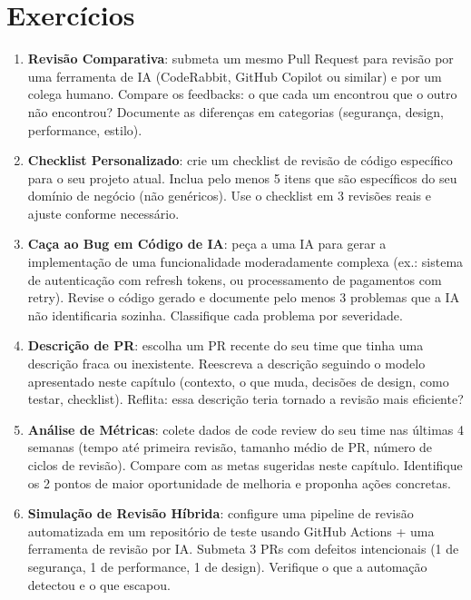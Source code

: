 \section*{Exercícios}

\begin{enumerate}
    \item \textbf{Revisão Comparativa}: submeta um mesmo Pull Request para
    revisão por uma ferramenta de IA (CodeRabbit, GitHub Copilot ou similar)
    e por um colega humano. Compare os feedbacks: o que cada um encontrou que
    o outro não encontrou? Documente as diferenças em categorias (segurança,
    design, performance, estilo).

    \item \textbf{Checklist Personalizado}: crie um checklist de revisão de
    código específico para o seu projeto atual. Inclua pelo menos 5 itens
    que são específicos do seu domínio de negócio (não genéricos). Use o
    checklist em 3 revisões reais e ajuste conforme necessário.

    \item \textbf{Caça ao Bug em Código de IA}: peça a uma IA para gerar
    a implementação de uma funcionalidade moderadamente complexa (ex.: sistema
    de autenticação com refresh tokens, ou processamento de pagamentos com
    retry). Revise o código gerado e documente pelo menos 3 problemas que a
    IA não identificaria sozinha. Classifique cada problema por severidade.

    \item \textbf{Descrição de PR}: escolha um PR recente do seu time que
    tinha uma descrição fraca ou inexistente. Reescreva a descrição seguindo
    o modelo apresentado neste capítulo (contexto, o que muda, decisões de
    design, como testar, checklist). Reflita: essa descrição teria tornado
    a revisão mais eficiente?

    \item \textbf{Análise de Métricas}: colete dados de code review do seu
    time nas últimas 4 semanas (tempo até primeira revisão, tamanho médio
    de PR, número de ciclos de revisão). Compare com as metas sugeridas
    neste capítulo. Identifique os 2 pontos de maior oportunidade de
    melhoria e proponha ações concretas.

    \item \textbf{Simulação de Revisão Híbrida}: configure uma pipeline de
    revisão automatizada em um repositório de teste usando GitHub Actions +
    uma ferramenta de revisão por IA. Submeta 3 PRs com defeitos intencionais
    (1 de segurança, 1 de performance, 1 de design). Verifique o que a
    automação detectou e o que escapou.
\end{enumerate}
